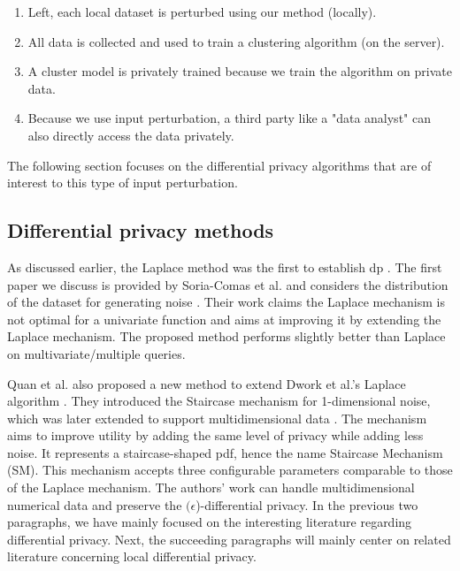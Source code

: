 \begin{enumerate}
    \item Left, each local dataset is perturbed using our method (locally).
    \item All data is collected and used to train a clustering algorithm (on the server).
    \item A cluster model is privately trained because we train the algorithm on private data.
    \item Because we use input perturbation, a third party like a "data analyst" can also directly access the data privately.
\end{enumerate}
The following section focuses on the differential privacy algorithms that are of interest to this type of input perturbation.

\newpage
\subsection{Differential privacy methods}
As discussed earlier, the Laplace method was the first to establish \gls{dp} \citep{dwork_differential_2006}.
The first paper we discuss is provided by Soria-Comas et al. and considers the distribution of the dataset for generating noise \citep{soria-comas_optimal_2013}.
Their work claims the Laplace mechanism is not optimal for a univariate function and aims at improving it by extending the Laplace mechanism.
The proposed method performs slightly better than Laplace on multivariate/multiple queries.

Quan et al. also proposed a new method to extend Dwork et al.'s Laplace algorithm \citep{geng_staircase_2015}.
They introduced the Staircase mechanism for 1-dimensional noise, which was later extended to support multidimensional data \citep{geng_staircase_2015}.
The mechanism aims to improve utility by adding the same level of privacy while adding less noise.
It represents a staircase-shaped \gls{pdf}, hence the name Staircase Mechanism (SM).
This mechanism accepts three configurable parameters comparable to those of the Laplace mechanism.
The authors' work can handle multidimensional numerical data and preserve the  $(\epsilon$)-differential privacy.
In the previous two paragraphs, we have mainly focused on the interesting literature regarding differential privacy.
Next, the succeeding paragraphs will mainly center on related literature concerning local differential privacy.\newline

